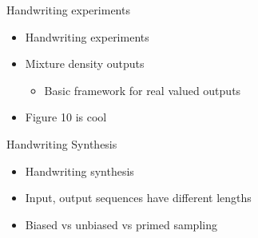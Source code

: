 \documentclass[xcolor=dvipsnames]{beamer}
\begin{document}
\begin{frame}{Handwriting experiments}
  \begin{itemize}
  \item 
 Handwriting experiments 
 \item
 Mixture density outputs
 \begin{itemize}
 \item Basic framework for real valued outputs
 \end{itemize}
\item 
 Figure 10 is cool
  \end{itemize}
\end{frame}

\begin{frame}{Handwriting Synthesis}
 \begin{itemize}
 \item 
 Handwriting synthesis 
 \item Input, output sequences have different lengths
 \item Biased vs unbiased vs primed sampling
 \end{itemize}
\end{frame}
\end{document}
